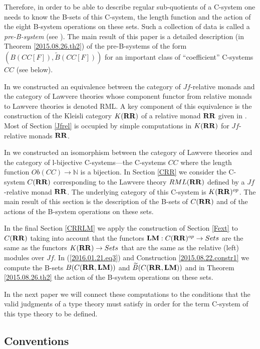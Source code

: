 \documentclass[onecolumn,12pt]{amsart}
\newcommand{\DG}[1]{}
\renewcommand{\DG}[1]{\todo[color=green!30]{DG: #1}\PackageWarning{TODO}{DG: #1}}
\numberwithin{proposition}{subsection}
\newcommand{\sr}{\rightarrow}
\newcommand{\nn}{{\mathbb N}}
\newcommand{\nat}{\nn}
\newcommand{\wt}{\widetilde}
\newcommand{\RR}{{\bf RR}}
\newcommand{\LM}{{\bf LM}}
\begin{document}
Therefore, in order to be able to describe regular sub-quotients of a C-system
one needs to know the B-sets of this C-system, the length function and the
action of the eight B-system operations on these sets. Such a collection of
data is called a {\em pre-B-system} (see \cite{Bsystems}).  The main result of this
paper is a detailed description (in Theorem \ref{2015.08.26.th2}) of the pre-B-systems of the form
$(B(CC[F]),\wt{B}(CC[F]))$ for an important class of ``coefficient''
C-systems $CC$ (see below).

In \cite{LandJf} we constructed an equivalence between the category of
$Jf$-relative monads and the category of Lawvere theories whose component
functor from relative monads to Lawvere theories is denoted \gls{RML}. A key
component of this equivalence is the construction of the Kleisli category
$K(\RR)$ of a relative monad $\RR$ given in \cite{ACU2}.  Most of Section
\ref{Jfrel} is occupied by simple computations in $K(\RR)$ for $Jf$-relative
monads $\RR$.

In \cite{LandC} we constructed an isomorphism between the category of Lawvere
theories and the category of l-bijective C-systems---the C-systems $CC$ where
the length function $Ob(CC)\sr \nat$ is a bijection. In Section \ref{CRR} we
consider the C-system $C(\RR)$ corresponding to the Lawvere theory $RML(\RR)$
defined by a $Jf$-relative monad $\RR$. The underlying category of this
C-system is $K(\RR)^{op}$. The main result of this section is the description
of the B-sets of $C(\RR)$ and of the actions of the B-system operations on these
sets.

In the final Section \ref{CRRLM} we apply the construction of Section
\ref{Fext} to $C(\RR)$ taking into account that the functors
$\LM:C(\RR)^{op}\sr Sets$ are the same as the functors $K(\RR)\sr Sets$ that
are the same as the relative (left) modules over $Jf$. In
(\ref{2016.01.21.eq3}) and Construction \ref{2015.08.22.constr1} we compute the
B-sets $B(C(\RR,\LM))$ and $\wt{B}(C(\RR,\LM))$ and in Theorem
\ref{2015.08.26.th2} the action of the B-system operations on these sets.

In the next paper we will connect these computations to the conditions that the
valid judgments of a type theory must satisfy in order for the term C-system
of this type theory to be defined.

\subsection{Conventions}
\end{document}
